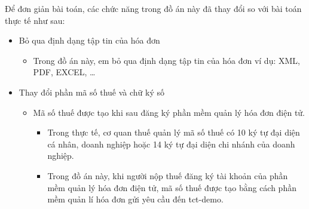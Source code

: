 Để đơn giản bài toán, các chức năng trong đồ án này đã thay đổi so với bài toán thực tế như sau:

\begin{itemize}

\item Bỏ qua định dạng tập tin của hóa đơn

\begin{itemize}

\item Trong đồ án này, em bỏ qua định dạng tập tin của hóa đơn ví dụ: XML, PDF, EXCEL, \dots

\end{itemize}

\item Thay đổi phần mã số thuế và chữ ký số

\begin{itemize}

\item Mã số thuế được tạo khi sau đăng ký phần mềm quản lý hóa đơn điện tử.

\begin{itemize}

\item Trong thực tế, cơ quan thuế quản lý mã số thuế có 10 ký tự đại diện cá nhân, doanh nghiệp hoặc 14 ký tự đại diện chi nhánh của doanh nghiệp.







\item Trong đồ án này, khi người nộp thuế đăng ký tài khoản của phần mềm quản lý hóa đơn điện tử, mã số thuế được tạo bằng cách phần mềm quản lí hóa đơn gửi yêu cầu đến tct-demo.


\end{itemize}
\end{itemize}
\end{itemize}
